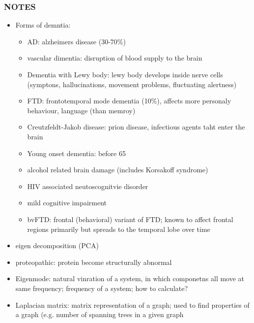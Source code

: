 \documentclass[fleqn]{article}\usepackage{caption}
\begin{document}
\subsubsection{NOTES}
\begin{itemize}
\item Forms of demntia:
\begin{itemize}
\item AD: alzheimers disease (30-70\%)
\item vascular dimentia: disruption of blood supply to the brain
\item Dementia with Lewy body: lewy body develops inside nerve cells (symptons, hallucinations, movement problems, fluctuating alertness)
\item FTD: frontotemporal mode dementia (10\%), affects more personaly behaviour, language (than memroy)
\item Creutzfeldt-Jakob disease: prion disease, infectious agents taht enter the brain
\item Young onset dementia: before 65
\item alcohol related brain damage (includes Korsakoff syndrome)
\item HIV associated neutoscognitvie disorder
\item mild cognitive impairment
\item bvFTD: frontal (behavioral) variant of FTD; known to affect frontal regions primarily but spreads to the temporal lobe over time
\end{itemize}
\item eigen decomposition (PCA)
\item proteopathic: protein become structurally abnormal
\item Eigenmode: natural vinration of a system, in which componetns all move at same frequency; frequency of a system; how to calculate?
\item Laplacian matrix: matrix representation of  a graph; used to find properties of a graph (e.g. number of spanning trees in a given graph
\end{itemize}
\end{document}
